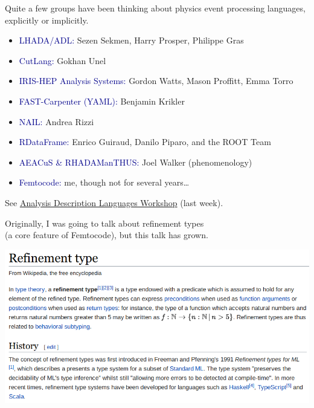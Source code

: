 \documentclass[aspectratio=169]{beamer}
\begin{document}
\begin{frame}{}
\large
\vspace{1.25 cm}
Quite a few groups have been thinking about physics event processing languages, explicitly or implicitly.

\vspace{0.25 cm}
\begin{itemize}
\item \textcolor{darkblue}{LHADA/ADL:} Sezen Sekmen, Harry Prosper, Philippe Gras
\item \textcolor{darkblue}{CutLang:} Gokhan Unel
\item \textcolor{darkblue}{IRIS-HEP Analysis Systems:} Gordon Watts, Mason Proffitt, Emma Torro
\item \textcolor{darkblue}{FAST-Carpenter (YAML):} Benjamin Krikler
\item \textcolor{darkblue}{NAIL:} Andrea Rizzi
\item \textcolor{darkblue}{RDataFrame:} Enrico Guiraud, Danilo Piparo, and the ROOT Team
\item \textcolor{darkblue}{AEACuS \& RHADAManTHUS:} Joel Walker (phenomenology)
\item \textcolor{darkblue}{Femtocode:} me, though not for several years\ldots
\end{itemize}

\vspace{0.25 cm}
\small \hfill See \textcolor{blue}{\href{https://indico.cern.ch/event/769263/timetable/}{Analysis Description Languages Workshop}} (last week).
\end{frame}

\begin{frame}{}
\Large
\vspace{1.25 cm}
\begin{center}
Originally, I was going to talk about refinement types \\ (a core feature of Femtocode), but this talk has grown.
\end{center}
\end{frame}

\begin{frame}{}
\vspace{1.25 cm}
\includegraphics[width=\linewidth]{refinement-wikipedia.png}
\end{frame}
\end{document}
